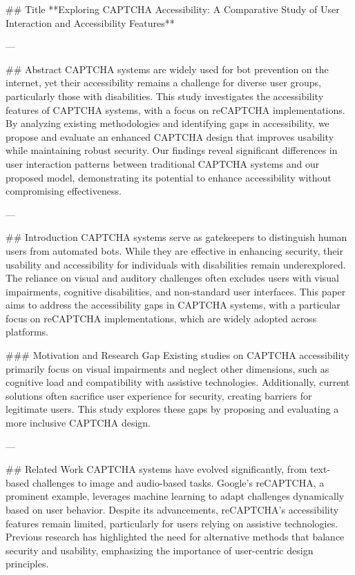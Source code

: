 ## Title  
**Exploring CAPTCHA Accessibility: A Comparative Study of User Interaction and Accessibility Features**

---

## Abstract  
CAPTCHA systems are widely used for bot prevention on the internet, yet their accessibility remains a challenge for diverse user groups, particularly those with disabilities. This study investigates the accessibility features of CAPTCHA systems, with a focus on reCAPTCHA implementations. By analyzing existing methodologies and identifying gaps in accessibility, we propose and evaluate an enhanced CAPTCHA design that improves usability while maintaining robust security. Our findings reveal significant differences in user interaction patterns between traditional CAPTCHA systems and our proposed model, demonstrating its potential to enhance accessibility without compromising effectiveness.

---

## Introduction  
CAPTCHA systems serve as gatekeepers to distinguish human users from automated bots. While they are effective in enhancing security, their usability and accessibility for individuals with disabilities remain underexplored. The reliance on visual and auditory challenges often excludes users with visual impairments, cognitive disabilities, and non-standard user interfaces. This paper aims to address the accessibility gaps in CAPTCHA systems, with a particular focus on reCAPTCHA implementations, which are widely adopted across platforms.

### Motivation and Research Gap  
Existing studies on CAPTCHA accessibility primarily focus on visual impairments and neglect other dimensions, such as cognitive load and compatibility with assistive technologies. Additionally, current solutions often sacrifice user experience for security, creating barriers for legitimate users. This study explores these gaps by proposing and evaluating a more inclusive CAPTCHA design.

---

## Related Work  
CAPTCHA systems have evolved significantly, from text-based challenges to image and audio-based tasks. Google's reCAPTCHA, a prominent example, leverages machine learning to adapt challenges dynamically based on user behavior. Despite its advancements, reCAPTCHA's accessibility features remain limited, particularly for users relying on assistive technologies. Previous research has highlighted the need for alternative methods that balance security and usability, emphasizing the importance of user-centric design principles.

